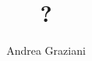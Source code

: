 \documentclass[10pt,a4paper]{report}
\author{Andrea Graziani}
\title{?}
\begin{document}
\begin{itemize}

\end{itemize}
\end{document}
